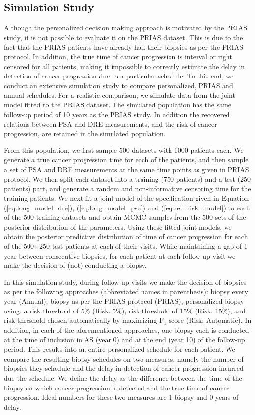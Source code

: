 \subsection{Simulation Study}
Although the personalized decision making approach is motivated by the PRIAS study, it is not possible to evaluate it on the PRIAS dataset. This is due to the fact that the PRIAS patients have already had their biopsies as per the PRIAS protocol. In addition, the true time of cancer progression is interval or right censored for all patients, making it impossible to correctly estimate the delay in detection of cancer progression due to a particular schedule. To this end, we conduct an extensive simulation study to compare personalized, PRIAS and annual schedules. For a realistic comparison, we simulate data from the joint model fitted to the PRIAS dataset. The simulated population has the same follow-up period of 10 years as the PRIAS study. In addition the recovered relations between PSA and DRE measurements, and the risk of cancer progression, are retained in the simulated population.

From this population, we first sample 500 datasets with 1000 patients each. We generate a true cancer progression time for each of the patients, and then sample a set of PSA and DRE measurements at the same time points as given in PRIAS protocol. We then split each dataset into a training (750 patients) and a test (250 patients) part, and generate a random and non‐informative censoring time for the training patients. We next fit a joint model of the specification given in Equation (\ref{eq:long_model_dre}), (\ref{eq:long_model_psa}) and (\ref{eq:rel_risk_model}) to each of the 500 training datasets and obtain MCMC samples from the 500 sets of the posterior distribution of the parameters. Using these fitted joint models, we obtain the posterior predictive distribution of time of cancer progression for each of the 500$\times$250 test patients at each of their visits. While maintaining a gap of 1 year between consecutive biopsies, for each patient at each follow-up visit we make the decision of (not) conducting a biopsy. 

In this simulation study, during follow-up visits we make the decision of biopsies as per the following approaches (abbreviated names in parenthesis): biopsy every year (Annual), biopsy as per the PRIAS protocol (PRIAS), personalized biopsy using: a risk threshold of 5\% (Risk: 5\%), risk threshold of 15\% (Risk: 15\%), and risk threshold chosen automatically by maximizing $\mbox{F}_1$ score (Risk: Automatic). In addition, in each of the aforementioned approaches, one biopsy each is conducted at the time of inclusion in  AS (year 0) and at the end (year 10) of the follow-up period. This results into an entire personalized schedule for each patient. We compare the resulting biopsy schedules on two measures, namely the number of biopsies they schedule and the delay in detection of cancer progression incurred due the schedule. We define the delay as the difference between the time of the biopsy on which cancer progression is detected and the true time of cancer progression. Ideal numbers for these two measures are 1 biopsy and 0 years of delay.